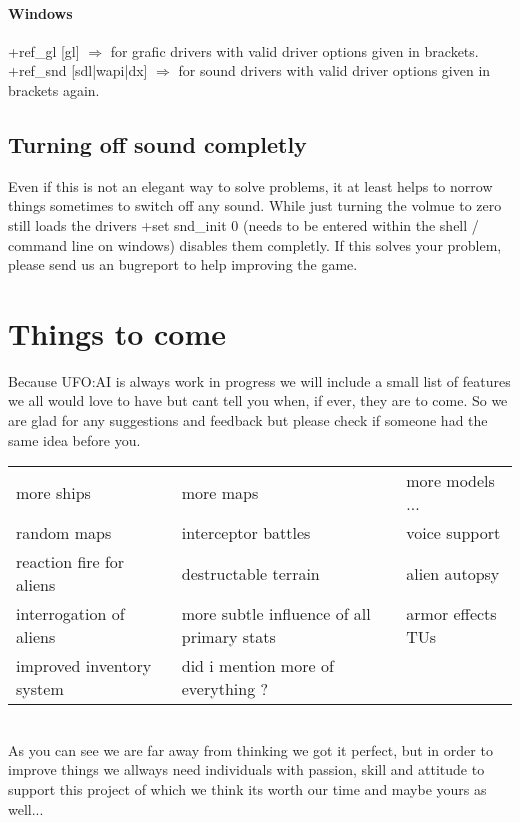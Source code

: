 \paragraph*{Windows}
+ref\_gl [gl] $\Longrightarrow$ for grafic drivers with valid driver options given in brackets.
+ref\_snd [sdl|wapi|dx] $\Longrightarrow$ for sound drivers with valid driver options given in brackets 																						again.

\subsection{Turning off sound completly}
Even if this is not an elegant way to solve problems, it at least helps to norrow things sometimes to switch off any sound. While just turning the volmue to zero still loads the drivers +set snd_init 0 (needs to be entered within the shell / command line on windows) disables them completly. If this solves your problem, please send us an bugreport to help improving the game.


\section{Things to come}
Because UFO:AI is always work in progress we will include a small list of features we all would love to have but cant tell you when, if ever, they are to come. So we are glad for any suggestions and feedback but please check if someone had the same idea before you.
\\
\begin{tabular}{lll}
more ships  & more maps & more models ...   \\ 
random maps & interceptor battles & voice support \\ 
reaction fire for aliens  & destructable terrain & alien autopsy \\ 
interrogation of aliens  & more subtle influence of all primary stats & armor effects TUs \\ 
improved inventory system & did i mention more of everything ? &  \\ 
\end{tabular} 
\\
As you can see we are far away from thinking we got it perfect, but in order to improve things we allways need individuals with passion, skill and attitude to support this project of which we think its worth our time and maybe yours as well...
